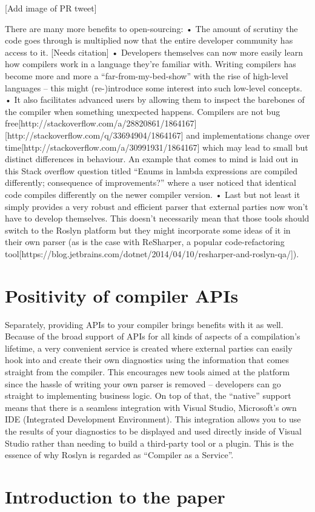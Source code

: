 [Add image of PR tweet]

There are many more benefits to open-sourcing:
•	The amount of scrutiny the code goes through is multiplied now that the entire developer community has access to it. [Needs citation]
•	Developers themselves can now more easily learn how compilers work in a language they’re familiar with. Writing compilers has become more and more a “far-from-my-bed-show” with the rise of high-level languages – this might (re-)introduce some interest into such low-level concepts.
•	It also facilitates advanced users by allowing them to inspect the barebones of the compiler when something unexpected happens. Compilers are not bug free[http://stackoverflow.com/a/28820861/1864167] [http://stackoverflow.com/q/33694904/1864167] and implementations change over time[http://stackoverflow.com/a/30991931/1864167] which may lead to small but distinct differences in behaviour. An example that comes to mind is laid out in this Stack overflow question titled “Enums in lambda expressions are compiled differently; consequence of improvements?” where a user noticed that identical code compiles differently on the newer compiler version.
•	Last but not least it simply provides a very robust and efficient parser that external parties now won’t have to develop themselves. This doesn’t necessarily mean that those tools should switch to the Roslyn platform but they might incorporate some ideas of it in their own parser (as is the case with ReSharper, a popular code-refactoring tool[https://blog.jetbrains.com/dotnet/2014/04/10/resharper-and-roslyn-qa/]).



\section{Positivity of compiler APIs}
\label{sec:intro-pos-api}

Separately, providing APIs to your compiler brings benefits with it as well. Because of the broad support of APIs for all kinds of aspects of a compilation’s lifetime, a very convenient service is created where external parties can easily hook into and create their own diagnostics using the information that comes straight from the compiler. This encourages new tools aimed at the platform since the hassle of writing your own parser is removed – developers can go straight to implementing business logic. On top of that, the “native” support means that there is a seamless integration with Visual Studio, Microsoft’s own IDE (Integrated Development Environment). This integration allows you to use the results of your diagnostics to be displayed and used directly inside of Visual Studio rather than needing to build a third-party tool or a plugin.
This is the essence of why Roslyn is regarded as “Compiler as a Service”.



\section{Introduction to the paper}
\label{sec-intro-paper}